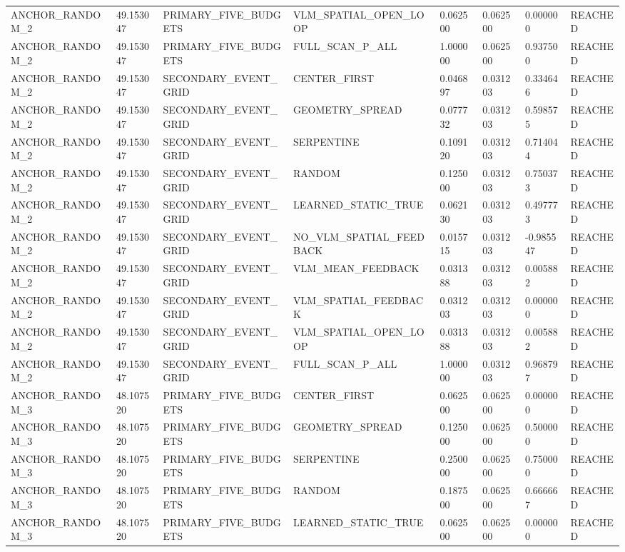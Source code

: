 \begin{tabular}{llllllll}
ANCHOR\_RANDOM\_2 & 49.153047 & PRIMARY\_FIVE\_BUDGETS & VLM\_SPATIAL\_OPEN\_LOOP & 0.062500 & 0.062500 & 0.000000 & REACHED \\
ANCHOR\_RANDOM\_2 & 49.153047 & PRIMARY\_FIVE\_BUDGETS & FULL\_SCAN\_P\_ALL & 1.000000 & 0.062500 & 0.937500 & REACHED \\
ANCHOR\_RANDOM\_2 & 49.153047 & SECONDARY\_EVENT\_GRID & CENTER\_FIRST & 0.046897 & 0.031203 & 0.334646 & REACHED \\
ANCHOR\_RANDOM\_2 & 49.153047 & SECONDARY\_EVENT\_GRID & GEOMETRY\_SPREAD & 0.077732 & 0.031203 & 0.598575 & REACHED \\
ANCHOR\_RANDOM\_2 & 49.153047 & SECONDARY\_EVENT\_GRID & SERPENTINE & 0.109120 & 0.031203 & 0.714044 & REACHED \\
ANCHOR\_RANDOM\_2 & 49.153047 & SECONDARY\_EVENT\_GRID & RANDOM & 0.125000 & 0.031203 & 0.750373 & REACHED \\
ANCHOR\_RANDOM\_2 & 49.153047 & SECONDARY\_EVENT\_GRID & LEARNED\_STATIC\_TRUE & 0.062130 & 0.031203 & 0.497773 & REACHED \\
ANCHOR\_RANDOM\_2 & 49.153047 & SECONDARY\_EVENT\_GRID & NO\_VLM\_SPATIAL\_FEEDBACK & 0.015715 & 0.031203 & -0.985547 & REACHED \\
ANCHOR\_RANDOM\_2 & 49.153047 & SECONDARY\_EVENT\_GRID & VLM\_MEAN\_FEEDBACK & 0.031388 & 0.031203 & 0.005882 & REACHED \\
ANCHOR\_RANDOM\_2 & 49.153047 & SECONDARY\_EVENT\_GRID & VLM\_SPATIAL\_FEEDBACK & 0.031203 & 0.031203 & 0.000000 & REACHED \\
ANCHOR\_RANDOM\_2 & 49.153047 & SECONDARY\_EVENT\_GRID & VLM\_SPATIAL\_OPEN\_LOOP & 0.031388 & 0.031203 & 0.005882 & REACHED \\
ANCHOR\_RANDOM\_2 & 49.153047 & SECONDARY\_EVENT\_GRID & FULL\_SCAN\_P\_ALL & 1.000000 & 0.031203 & 0.968797 & REACHED \\
ANCHOR\_RANDOM\_3 & 48.107520 & PRIMARY\_FIVE\_BUDGETS & CENTER\_FIRST & 0.062500 & 0.062500 & 0.000000 & REACHED \\
ANCHOR\_RANDOM\_3 & 48.107520 & PRIMARY\_FIVE\_BUDGETS & GEOMETRY\_SPREAD & 0.125000 & 0.062500 & 0.500000 & REACHED \\
ANCHOR\_RANDOM\_3 & 48.107520 & PRIMARY\_FIVE\_BUDGETS & SERPENTINE & 0.250000 & 0.062500 & 0.750000 & REACHED \\
ANCHOR\_RANDOM\_3 & 48.107520 & PRIMARY\_FIVE\_BUDGETS & RANDOM & 0.187500 & 0.062500 & 0.666667 & REACHED \\
ANCHOR\_RANDOM\_3 & 48.107520 & PRIMARY\_FIVE\_BUDGETS & LEARNED\_STATIC\_TRUE & 0.062500 & 0.062500 & 0.000000 & REACHED \\

\end{tabular}

